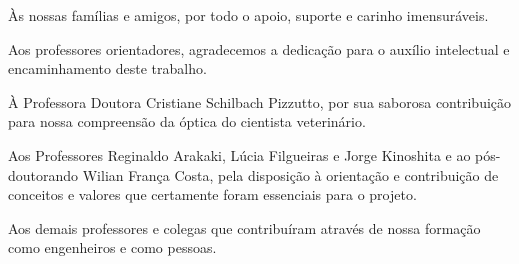 \begin{agradecimentos}
Às nossas famílias e amigos, por todo o apoio, suporte e carinho imensuráveis.

Aos professores orientadores, agradecemos a dedicação para o auxílio intelectual e encaminhamento deste trabalho.

À Professora Doutora Cristiane Schilbach Pizzutto, por sua saborosa contribuição para nossa compreensão da óptica do cientista veterinário.

Aos Professores Reginaldo Arakaki, Lúcia Filgueiras e Jorge Kinoshita e ao pós-doutorando Wilian França Costa, pela disposição à orientação e contribuição de conceitos e valores que certamente foram essenciais para o projeto.

Aos demais professores e colegas que contribuíram através de nossa formação como engenheiros e como pessoas.
\end{agradecimentos}